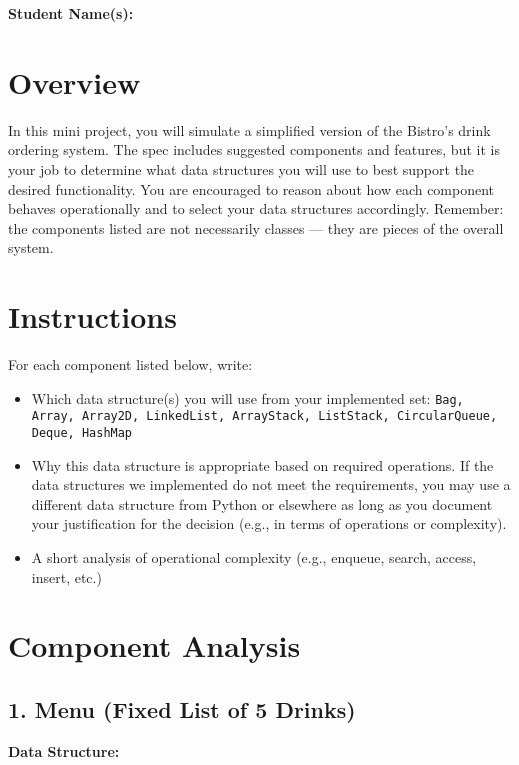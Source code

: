 \documentclass[12pt]{article}
\begin{document}
\noindent
\textbf{Student Name(s):} \hrulefill

\vspace{1em}

\section*{Overview}

In this mini project, you will simulate a simplified version of the Bistro’s drink ordering system. The spec includes suggested components and features, but it is your job to determine what data structures you will use to best support the desired functionality. You are encouraged to reason about how each component behaves operationally and to select your data structures accordingly. Remember: the components listed are not necessarily classes — they are pieces of the overall system.

\vspace{1em}

\section*{Instructions}
For each component listed below, write:
\begin{itemize}
  \item Which data structure(s) you will use from your implemented set: \texttt{Bag, Array, Array2D, LinkedList, ArrayStack, ListStack, CircularQueue, Deque, HashMap}
  \item Why this data structure is appropriate based on required operations. If the data structures we implemented do not meet the requirements, you may use a different data structure from Python or elsewhere as long as you document your justification for the decision (e.g., in terms of operations or complexity).
  \item A short analysis of operational complexity (e.g., enqueue, search, access, insert, etc.)
\end{itemize}

\vspace{1em}

\section*{Component Analysis}

\subsection*{1. Menu (Fixed List of 5 Drinks)}
\textbf{Data Structure:} \hrulefill
\end{document}
